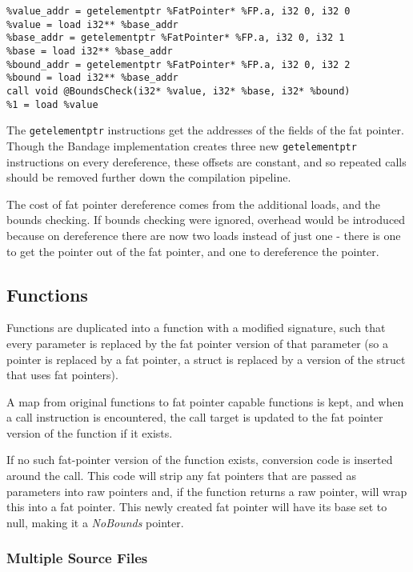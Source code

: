 \begin{verbatim}
%value_addr = getelementptr %FatPointer* %FP.a, i32 0, i32 0
%value = load i32** %base_addr
%base_addr = getelementptr %FatPointer* %FP.a, i32 0, i32 1
%base = load i32** %base_addr
%bound_addr = getelementptr %FatPointer* %FP.a, i32 0, i32 2
%bound = load i32** %base_addr
call void @BoundsCheck(i32* %value, i32* %base, i32* %bound)
%1 = load %value
\end{verbatim}

The \verb!getelementptr! instructions get the addresses of the fields of the fat pointer.
Though the Bandage implementation creates three new \verb!getelementptr! instructions on every dereference, these offsets are constant, and so repeated calls should be removed further down the compilation pipeline.

The cost of fat pointer dereference comes from the additional loads, and the bounds checking.
If bounds checking were ignored, overhead would be introduced because on dereference there are now two loads instead of just one - there is one to get the pointer out of the fat pointer, and one to dereference the pointer.

\subsection{Functions}

Functions are duplicated into a function with a modified signature, such that every parameter is replaced by the fat pointer version of that parameter (so a pointer is replaced by a fat pointer, a struct is replaced by a version of the struct that uses fat pointers).

A map from original functions to fat pointer capable functions is kept, and when a call instruction is encountered, the call target is updated to the fat pointer version of the function if it exists.

If no such fat-pointer version of the function exists, conversion code is inserted around the call.
This code will strip any fat pointers that are passed as parameters into raw pointers and, if the function returns a raw pointer, will wrap this into a fat pointer.
This newly created fat pointer will have its base set to null, making it a \textit{NoBounds} pointer.

\subsubsection{Multiple Source Files}

